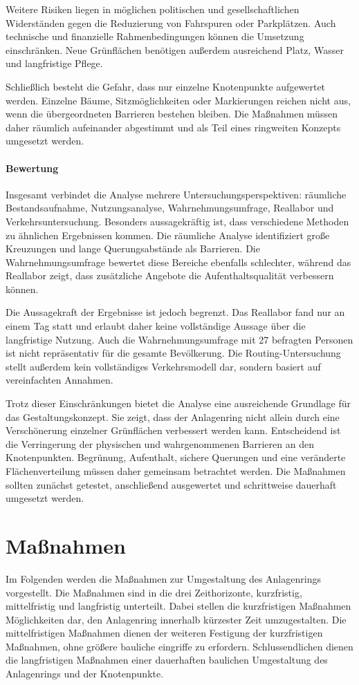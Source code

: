 \documentclass[a4paper,12pt]{article}
\begin{document}
Weitere Risiken liegen in möglichen politischen und gesellschaftlichen Widerständen gegen die Reduzierung von Fahrspuren oder Parkplätzen. Auch technische und finanzielle Rahmenbedingungen können die Umsetzung einschränken. Neue Grünflächen benötigen außerdem ausreichend Platz, Wasser und langfristige Pflege.

Schließlich besteht die Gefahr, dass nur einzelne Knotenpunkte aufgewertet werden. Einzelne Bäume, Sitzmöglichkeiten oder Markierungen reichen nicht aus, wenn die übergeordneten Barrieren bestehen bleiben. Die Maßnahmen müssen daher räumlich aufeinander abgestimmt und als Teil eines ringweiten Konzepts umgesetzt werden.

\paragraph{Bewertung}

Insgesamt verbindet die Analyse mehrere Untersuchungsperspektiven: räumliche Bestandsaufnahme, Nutzungsanalyse, Wahrnehmungsumfrage, Reallabor und Verkehrsuntersuchung. Besonders aussagekräftig ist, dass verschiedene Methoden zu ähnlichen Ergebnissen kommen. Die räumliche Analyse identifiziert große Kreuzungen und lange Querungsabstände als Barrieren. Die Wahrnehmungsumfrage bewertet diese Bereiche ebenfalls schlechter, während das Reallabor zeigt, dass zusätzliche Angebote die Aufenthaltsqualität verbessern können.

Die Aussagekraft der Ergebnisse ist jedoch begrenzt. Das Reallabor fand nur an einem Tag statt und erlaubt daher keine vollständige Aussage über die langfristige Nutzung. Auch die Wahrnehmungsumfrage mit 27 befragten Personen ist nicht repräsentativ für die gesamte Bevölkerung. Die Routing-Untersuchung stellt außerdem kein vollständiges Verkehrsmodell dar, sondern basiert auf vereinfachten Annahmen.

Trotz dieser Einschränkungen bietet die Analyse eine ausreichende Grundlage für das Gestaltungskonzept. Sie zeigt, dass der Anlagenring nicht allein durch eine Verschönerung einzelner Grünflächen verbessert werden kann. Entscheidend ist die Verringerung der physischen und wahrgenommenen Barrieren an den Knotenpunkten. Begrünung, Aufenthalt, sichere Querungen und eine veränderte Flächenverteilung müssen daher gemeinsam betrachtet werden. Die Maßnahmen sollten zunächst getestet, anschließend ausgewertet und schrittweise dauerhaft umgesetzt werden.




\section{Maßnahmen}
Im Folgenden werden die Maßnahmen zur Umgestaltung des Anlagenrings vorgestellt. Die Maßnahmen sind in die drei Zeithorizonte, kurzfristig, mittelfristig und langfristig unterteilt. Dabei stellen die kurzfristigen Maßnahmen Möglichkeiten dar, den Anlagenring innerhalb kürzester Zeit umzugestalten. Die mittelfristigen Maßnahmen dienen der weiteren Festigung der kurzfristigen Maßnahmen, ohne größere bauliche eingriffe zu erfordern. Schlussendlichen dienen die langfristigen Maßnahmen einer dauerhaften baulichen Umgestaltung des Anlagenrings und der Knotenpunkte.
\end{document}
